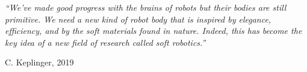 \documentclass[a4paper, 11pt, oneside]{Thesis}  %
\begin{document}
	\pagestyle{empty}  %
	\null\vfill
	\textit{``We've made good progress with the brains of robots but their bodies are still primitive. We need a new kind of robot body that is inspired by elegance, efficiency, and by the soft materials found in nature. Indeed, this has become the key idea of a new field of research called soft robotics.''}
	\begin{flushright}
		C. Keplinger, 2019
	\end{flushright}
	\vfill\vfill\vfill\vfill\vfill\vfill\null
	\clearpage  %
	\pagestyle{plain}  %
\end{document}
